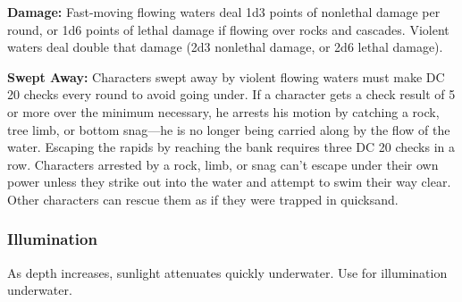 
\textbf{Damage:} Fast-moving flowing waters deal 1d3 points of nonlethal damage per round, or 1d6 points of lethal damage if flowing over rocks and cascades. Violent waters deal double that damage (2d3 nonlethal damage, or 2d6 lethal damage).

\textbf{Swept Away:} Characters swept away by violent flowing waters must make DC 20  checks every round to avoid going under. If a character gets a check result of 5 or more over the minimum necessary, he arrests his motion by catching a rock, tree limb, or bottom snag---he is no longer being carried along by the flow of the water. Escaping the rapids by reaching the bank requires three DC 20  checks in a row. Characters arrested by a rock, limb, or snag can't escape under their own power unless they strike out into the water and attempt to swim their way clear. Other characters can rescue them as if they were trapped in quicksand.

\subsubsection{Illumination}
As depth increases, sunlight attenuates quickly underwater. Use  for illumination underwater.


